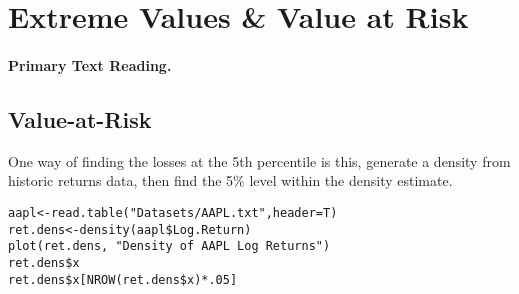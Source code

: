 \section{Extreme Values \& Value at Risk}
\paragraph{Primary Text Reading.} 

\subsection{Value-at-Risk}
One way of finding the losses at the 5th percentile is this, generate a density from historic returns data, then find the 5\% level within the density estimate.
\begin{verbatim}
aapl<-read.table("Datasets/AAPL.txt",header=T)
ret.dens<-density(aapl$Log.Return)
plot(ret.dens, "Density of AAPL Log Returns")
ret.dens$x
ret.dens$x[NROW(ret.dens$x)*.05]
\end{verbatim}